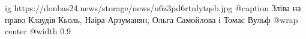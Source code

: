  
 
 
 
 

\ifcmt
  ig https://donbas24.news/storage/news/u6z3pd6rtnlytqsb.jpg
	@caption Зліва на право Клаудія Кьоль, Наіра Арзуманян, Ольга Самойлова і Томас Вульф
  @wrap center
  @width 0.9
\fi
